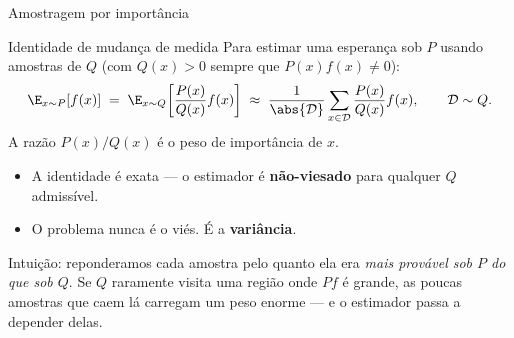 \documentclass[aspectratio=169, 10pt]{beamer}
\newcommand{\Dtot}{\mathcal{D}}
\begin{document}
\begin{frame}{Amostragem por importância}

  \begin{defbox}{Identidade de mudança de medida}
    Para estimar uma esperança sob $P$ usando amostras de $Q$ (com $Q(x)>0$ sempre
    que $P(x)f(x)\neq 0$):
    \[
      \E_{x\sim P}[f(x)] \;=\; \E_{x\sim Q}\!\left[\frac{P(x)}{Q(x)} f(x)\right]
      \;\approx\; \frac{1}{\abs{\Dtot}}\sum_{x\in\Dtot}\frac{P(x)}{Q(x)} f(x),
      \qquad \Dtot \sim Q .
    \]
    A razão $P(x)/Q(x)$ é o \alert{peso de importância} de $x$.
  \end{defbox}

  \begin{itemize}\setlength{\itemsep}{0.3ex}
    \item A identidade é exata --- o estimador é \textbf{não-viesado} para qualquer $Q$
      admissível.
    \item O problema nunca é o viés. É a \textbf{variância}.
  \end{itemize}

  \begin{ideiabox}
    Intuição: reponderamos cada amostra pelo quanto ela era \emph{mais provável sob
    $P$ do que sob $Q$}. Se $Q$ raramente visita uma região onde $P f$ é grande,
    as poucas amostras que caem lá carregam um peso enorme --- e o estimador passa
    a depender delas.
  \end{ideiabox}
\end{frame}
\end{document}
